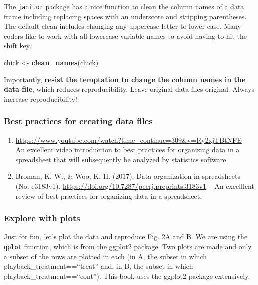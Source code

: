 \documentclass[]{book}
\newenvironment{Shaded}{\begin{snugshade}}{\end{snugshade}}
\newcommand{\KeywordTok}[1]{\textcolor[rgb]{0.13,0.29,0.53}{\textbf{#1}}}
\newcommand{\StringTok}[1]{\textcolor[rgb]{0.31,0.60,0.02}{#1}}
\newcommand{\NormalTok}[1]{#1}
\begin{document}
The \texttt{janitor} package has a nice function to clean the column
names of a data frame including replacing spaces with an underscore and
stripping parentheses. The default clean includes changing any uppercase
letter to lower case. Many coders like to work with all lowercase
variable names to avoid having to hit the shift key.

\begin{Shaded}
\begin{Highlighting}[]
\NormalTok{chick <-}\StringTok{ }\KeywordTok{clean_names}\NormalTok{(chick)}
\end{Highlighting}
\end{Shaded}

Importantly, \textbf{resist the temptation to change the column names in
the data file}, which reduces reproducibility. Leave original data files
original. Always increase reproducibility!

\subsubsection{Best practices for creating data
files}\label{best-practices-for-creating-data-files}

\begin{enumerate}
\def\labelenumi{\arabic{enumi}.}
\item
  \url{https://www.youtube.com/watch?time_continue=309\&v=Ry2xjTBtNFE}
  -- An excellent video introduction to best practices for organizing
  data in a spreadsheet that will subsequently be analyzed by statistics
  software.
\item
  Broman, K. W., \& Woo, K. H. (2017). Data organization in spreadsheets
  (No. e3183v1). \url{https://doi.org/10.7287/peerj.preprints.3183v1} --
  An excelllent review of best practices for organizing data in a
  spreadsheet.
\end{enumerate}

\subsubsection{Explore with plots}\label{explore-with-plots}

Just for fun, let's plot the data and reproduce Fig. 2A and B. We are
using the \texttt{qplot} function, which is from the ggplot2 package.
Two plots are made and only a subset of the rows are plotted in each (in
A, the subset in which playback\_treatment==``treat'' and, in B, the
subset in which playback\_treatment==``cont''). This book uses the
ggplot2 package extensively.
\end{document}
